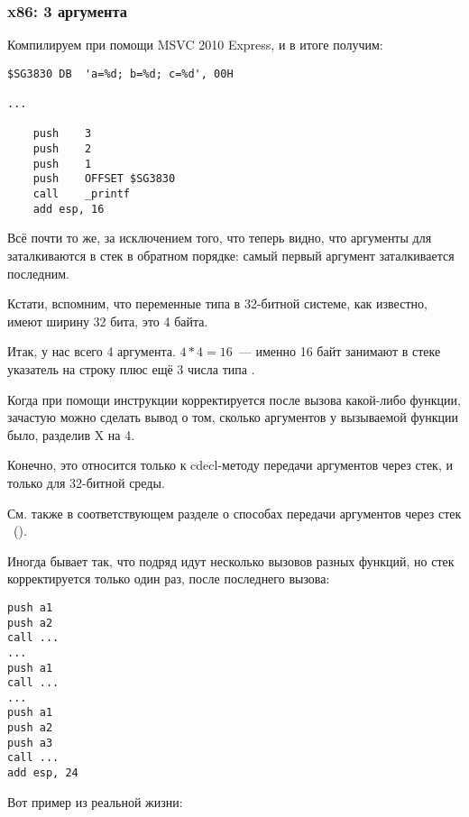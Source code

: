 \subsubsection{x86: 3 аргумента}


Компилируем при помощи MSVC 2010 Express, и в итоге получим:

\begin{lstlisting}[style=customasm]
$SG3830	DB	'a=%d; b=%d; c=%d', 00H

...

	push	3
	push	2
	push	1
	push	OFFSET $SG3830
	call	_printf
	add	esp, 16
\end{lstlisting}

Всё почти то же, за исключением того, что теперь видно, что аргументы для \printf заталкиваются в стек в обратном порядке: самый первый аргумент заталкивается последним.

Кстати, вспомним, что переменные типа \Tint в 32-битной системе, как известно, имеют ширину 32 бита, это 4 байта.

Итак, у нас всего 4 аргумента. $4*4 = 16$~--- именно 16 байт занимают в стеке указатель на строку плюс ещё 3 числа типа \Tint.

Когда при помощи инструкции  корректируется  \ESP 
после вызова какой-либо функции, зачастую можно сделать вывод о том, сколько аргументов 
у вызываемой функции было, разделив X на 4.

Конечно, это относится только к cdecl-методу передачи аргументов через стек, и только для 32-битной среды.

См. также в соответствующем разделе о способах передачи аргументов через стек ~().

Иногда бывает так, что подряд идут несколько вызовов разных функций, но стек корректируется только один раз, после последнего вызова:

\begin{lstlisting}[style=customasm]
push a1
push a2
call ...
...
push a1
call ...
...
push a1
push a2
push a3
call ...
add esp, 24
\end{lstlisting}

Вот пример из реальной жизни:



